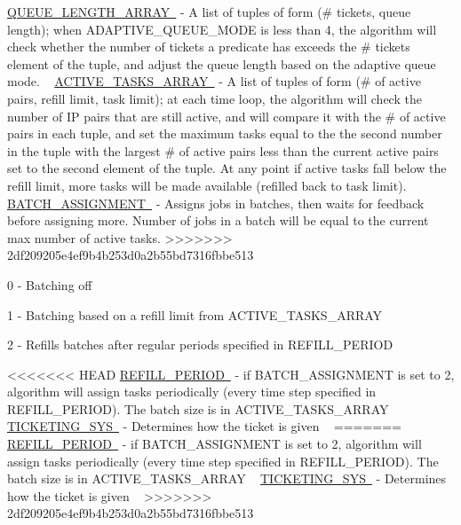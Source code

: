 \mbox{\hyperlink{}{Q\+U\+E\+U\+E\+\_\+\+L\+E\+N\+G\+T\+H\+\_\+\+A\+R\+R\+AY }} -\/ A list of tuples of form (\# tickets, queue length); when A\+D\+A\+P\+T\+I\+V\+E\+\_\+\+Q\+U\+E\+U\+E\+\_\+\+M\+O\+DE is less than 4, the algorithm will check whether the number of tickets a predicate has exceeds the \# tickets element of the tuple, and adjust the queue length based on the adaptive queue mode. ~\newline
 \mbox{\hyperlink{}{A\+C\+T\+I\+V\+E\+\_\+\+T\+A\+S\+K\+S\+\_\+\+A\+R\+R\+AY }} -\/ A list of tuples of form (\# of active pairs, refill limit, task limit); at each time loop, the algorithm will check the number of IP pairs that are still active, and will compare it with the \# of active pairs in each tuple, and set the maximum tasks equal to the the second number in the tuple with the largest \# of active pairs less than the current active pairs set to the second element of the tuple. At any point if active tasks fall below the refill limit, more tasks will be made available (refilled back to task limit). ~\newline
 \mbox{\hyperlink{}{B\+A\+T\+C\+H\+\_\+\+A\+S\+S\+I\+G\+N\+M\+E\+NT }} -\/ Assigns jobs in batches, then waits for feedback before assigning more. Number of jobs in a batch will be equal to the current max number of active tasks.
>>>>>>> 2df209205e4ef9b4b253d0a2b55bd7316fbbe513
\begin{DoxyItemize}
\item 0 -\/ Batching off
\item 1 -\/ Batching based on a refill limit from A\+C\+T\+I\+V\+E\+\_\+\+T\+A\+S\+K\+S\+\_\+\+A\+R\+R\+AY
\item 2 -\/ Refills batches after regular periods specified in R\+E\+F\+I\+L\+L\+\_\+\+P\+E\+R\+I\+OD
\end{DoxyItemize}

<<<<<<< HEAD
\mbox{\hyperlink{namespacedynamicfilterapp_1_1toggles_a26c4f956b0a9438426925bee66b89a2b}{R\+E\+F\+I\+L\+L\+\_\+\+P\+E\+R\+I\+OD }} -\/ if B\+A\+T\+C\+H\+\_\+\+A\+S\+S\+I\+G\+N\+M\+E\+NT is set to 2, algorithm will assign tasks periodically (every time step specified in R\+E\+F\+I\+L\+L\+\_\+\+P\+E\+R\+I\+OD). The batch size is in A\+C\+T\+I\+V\+E\+\_\+\+T\+A\+S\+K\+S\+\_\+\+A\+R\+R\+AY ~\newline
 \mbox{\hyperlink{namespacedynamicfilterapp_1_1toggles_a4efd3667e6643a4cd2b96c4e647fa2f7}{T\+I\+C\+K\+E\+T\+I\+N\+G\+\_\+\+S\+YS }} -\/ Determines how the ticket is given ~\newline
=======
\mbox{\hyperlink{}{R\+E\+F\+I\+L\+L\+\_\+\+P\+E\+R\+I\+OD }} -\/ if B\+A\+T\+C\+H\+\_\+\+A\+S\+S\+I\+G\+N\+M\+E\+NT is set to 2, algorithm will assign tasks periodically (every time step specified in R\+E\+F\+I\+L\+L\+\_\+\+P\+E\+R\+I\+OD). The batch size is in A\+C\+T\+I\+V\+E\+\_\+\+T\+A\+S\+K\+S\+\_\+\+A\+R\+R\+AY ~\newline
 \mbox{\hyperlink{}{T\+I\+C\+K\+E\+T\+I\+N\+G\+\_\+\+S\+YS }} -\/ Determines how the ticket is given ~\newline
>>>>>>> 2df209205e4ef9b4b253d0a2b55bd7316fbbe513

